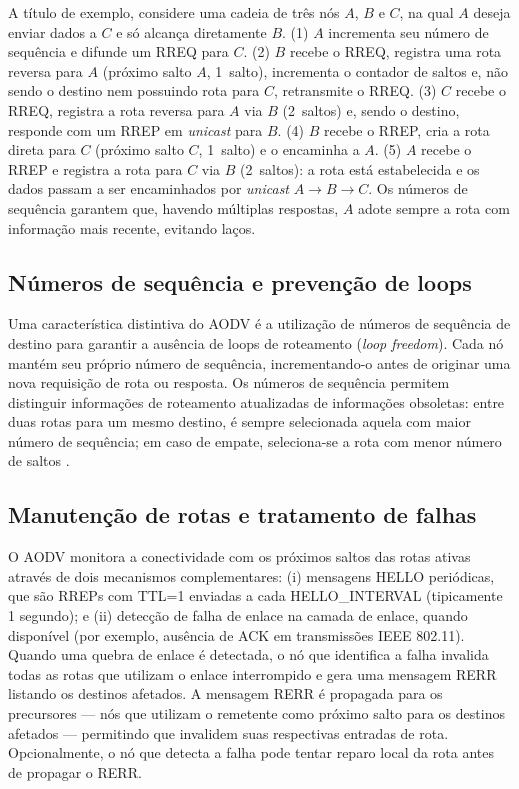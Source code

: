 A título de exemplo, considere uma cadeia de três nós $A$, $B$ e $C$, na
qual $A$ deseja enviar dados a $C$ e só alcança diretamente $B$. (1) $A$
incrementa seu número de sequência e difunde um RREQ para $C$. (2) $B$
recebe o RREQ, registra uma rota reversa para $A$ (próximo salto $A$,
1~salto), incrementa o contador de saltos e, não sendo o destino nem
possuindo rota para $C$, retransmite o RREQ. (3) $C$ recebe o RREQ,
registra a rota reversa para $A$ via $B$ (2~saltos) e, sendo o destino,
responde com um RREP em \emph{unicast} para $B$. (4) $B$ recebe o RREP,
cria a rota direta para $C$ (próximo salto $C$, 1~salto) e o encaminha a
$A$. (5) $A$ recebe o RREP e registra a rota para $C$ via $B$ (2~saltos):
a rota está estabelecida e os dados passam a ser encaminhados por
\emph{unicast} $A \rightarrow B \rightarrow C$. Os números de sequência
garantem que, havendo múltiplas respostas, $A$ adote sempre a rota com
informação mais recente, evitando laços.

\subsection{Números de sequência e prevenção de
loops}\label{nuxfameros-de-sequuxeancia-e-prevenuxe7uxe3o-de-loops}

Uma característica distintiva do AODV é a utilização de números de
sequência de destino para garantir a ausência de loops de roteamento
(\emph{loop freedom}). Cada nó mantém seu próprio número de sequência,
incrementando-o antes de originar uma nova requisição de rota ou
resposta. Os números de sequência permitem distinguir informações de
roteamento atualizadas de informações obsoletas: entre duas rotas para
um mesmo destino, é sempre selecionada aquela com maior número de
sequência; em caso de empate, seleciona-se a rota com menor número de
saltos \cite{perkins2003}.

\subsection{Manutenção de rotas e tratamento de
falhas}\label{manutenuxe7uxe3o-de-rotas-e-tratamento-de-falhas}

O AODV monitora a conectividade com os próximos saltos das rotas ativas
através de dois mecanismos complementares: (i) mensagens HELLO
periódicas, que são RREPs com TTL=1 enviadas a cada HELLO\_INTERVAL
(tipicamente 1 segundo); e (ii) detecção de falha de enlace na camada de
enlace, quando disponível (por exemplo, ausência de ACK em transmissões
IEEE 802.11). Quando uma quebra de enlace é detectada, o nó que
identifica a falha invalida todas as rotas que utilizam o enlace
interrompido e gera uma mensagem RERR listando os destinos afetados. A
mensagem RERR é propagada para os precursores --- nós que utilizam o
remetente como próximo salto para os destinos afetados --- permitindo
que invalidem suas respectivas entradas de rota. Opcionalmente, o nó que
detecta a falha pode tentar reparo local da rota antes de propagar o
RERR.

